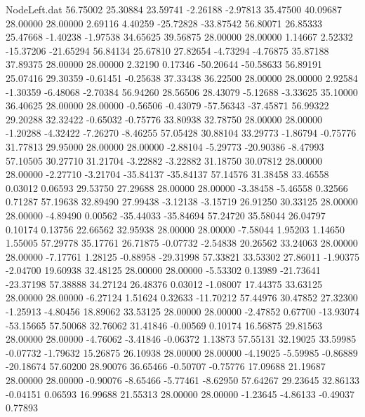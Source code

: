 \begin{filecontents}{NodeLeft.dat}
  56.75002   25.30884   23.59741    -2.26188   -2.97813   35.47500   40.09687   28.00000   28.00000    2.69116    4.40259  -25.72828  -33.87542
  56.80071   26.85333   25.47668    -1.40238   -1.97538   34.65625   39.56875   28.00000   28.00000    1.14667    2.52332  -15.37206  -21.65294
  56.84134   25.67810   27.82654    -4.73294   -4.76875   35.87188   37.89375   28.00000   28.00000    2.32190    0.17346  -50.20644  -50.58633
  56.89191   25.07416   29.30359    -0.61451   -0.25638   37.33438   36.22500   28.00000   28.00000    2.92584   -1.30359   -6.48068   -2.70384
  56.94260   28.56506   28.43079    -5.12688   -3.33625   35.10000   36.40625   28.00000   28.00000   -0.56506   -0.43079  -57.56343  -37.45871
  56.99322   29.20288   32.32422    -0.65032   -0.75776   33.80938   32.78750   28.00000   28.00000   -1.20288   -4.32422   -7.26270   -8.46255
  57.05428   30.88104   33.29773    -1.86794   -0.75776   31.77813   29.95000   28.00000   28.00000   -2.88104   -5.29773  -20.90386   -8.47993
  57.10505   30.27710   31.21704    -3.22882   -3.22882   31.18750   30.07812   28.00000   28.00000   -2.27710   -3.21704  -35.84137  -35.84137
  57.14576   31.38458   33.46558     0.03012    0.06593   29.53750   27.29688   28.00000   28.00000   -3.38458   -5.46558    0.32566    0.71287
  57.19638   32.89490   27.99438    -3.12138   -3.15719   26.91250   30.33125   28.00000   28.00000   -4.89490    0.00562  -35.44033  -35.84694
  57.24720   35.58044   26.04797     0.10174    0.13756   22.66562   32.95938   28.00000   28.00000   -7.58044    1.95203    1.14650    1.55005
  57.29778   35.17761   26.71875    -0.07732   -2.54838   20.26562   33.24063   28.00000   28.00000   -7.17761    1.28125   -0.88958  -29.31998
  57.33821   33.53302   27.86011    -1.90375   -2.04700   19.60938   32.48125   28.00000   28.00000   -5.53302    0.13989  -21.73641  -23.37198
  57.38888   34.27124   26.48376     0.03012   -1.08007   17.44375   33.63125   28.00000   28.00000   -6.27124    1.51624    0.32633  -11.70212
  57.44976   30.47852   27.32300    -1.25913   -4.80456   18.89062   33.53125   28.00000   28.00000   -2.47852    0.67700  -13.93074  -53.15665
  57.50068   32.76062   31.41846    -0.00569    0.10174   16.56875   29.81563   28.00000   28.00000   -4.76062   -3.41846   -0.06372    1.13873
  57.55131   32.19025   33.59985    -0.07732   -1.79632   15.26875   26.10938   28.00000   28.00000   -4.19025   -5.59985   -0.86889  -20.18674
  57.60200   28.90076   36.65466    -0.50707   -0.75776   17.09688   21.19687   28.00000   28.00000   -0.90076   -8.65466   -5.77461   -8.62950
  57.64267   29.23645   32.86133    -0.04151    0.06593   16.99688   21.55313   28.00000   28.00000   -1.23645   -4.86133   -0.49037    0.77893

\end{filecontents}
